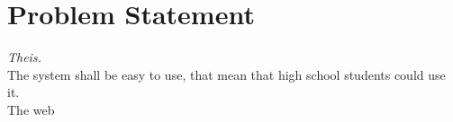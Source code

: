 \section{Problem Statement}\textit{Theis.}\\
The system shall be easy to use, that mean that high school students could use it.\\
The web 
